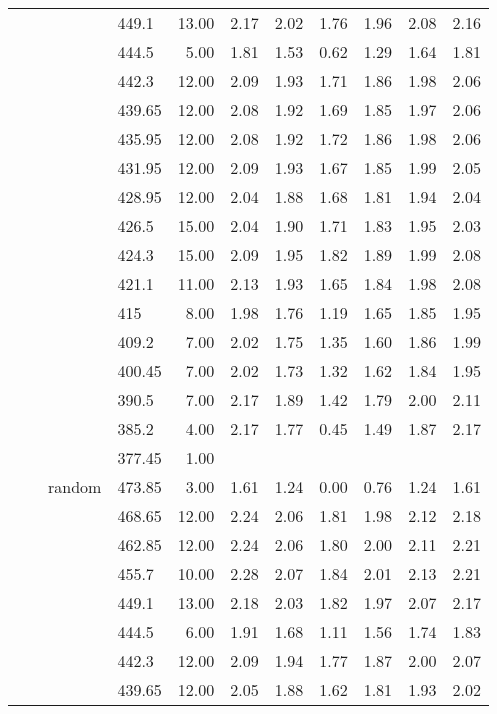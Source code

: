 \begin{longtable}{llllrrrrrrr}
   &  &  & 449.1 & 13.00 & 2.17 & 2.02 & 1.76 & 1.96 & 2.08 & 2.16 \\ 
   &  &  & 444.5 & 5.00 & 1.81 & 1.53 & 0.62 & 1.29 & 1.64 & 1.81 \\ 
   &  &  & 442.3 & 12.00 & 2.09 & 1.93 & 1.71 & 1.86 & 1.98 & 2.06 \\ 
   &  &  & 439.65 & 12.00 & 2.08 & 1.92 & 1.69 & 1.85 & 1.97 & 2.06 \\ 
   &  &  & 435.95 & 12.00 & 2.08 & 1.92 & 1.72 & 1.86 & 1.98 & 2.06 \\ 
   &  &  & 431.95 & 12.00 & 2.09 & 1.93 & 1.67 & 1.85 & 1.99 & 2.05 \\ 
   &  &  & 428.95 & 12.00 & 2.04 & 1.88 & 1.68 & 1.81 & 1.94 & 2.04 \\ 
   &  &  & 426.5 & 15.00 & 2.04 & 1.90 & 1.71 & 1.83 & 1.95 & 2.03 \\ 
   &  &  & 424.3 & 15.00 & 2.09 & 1.95 & 1.82 & 1.89 & 1.99 & 2.08 \\ 
   &  &  & 421.1 & 11.00 & 2.13 & 1.93 & 1.65 & 1.84 & 1.98 & 2.08 \\ 
   &  &  & 415 & 8.00 & 1.98 & 1.76 & 1.19 & 1.65 & 1.85 & 1.95 \\ 
   &  &  & 409.2 & 7.00 & 2.02 & 1.75 & 1.35 & 1.60 & 1.86 & 1.99 \\ 
   &  &  & 400.45 & 7.00 & 2.02 & 1.73 & 1.32 & 1.62 & 1.84 & 1.95 \\ 
   &  &  & 390.5 & 7.00 & 2.17 & 1.89 & 1.42 & 1.79 & 2.00 & 2.11 \\ 
   &  &  & 385.2 & 4.00 & 2.17 & 1.77 & 0.45 & 1.49 & 1.87 & 2.17 \\ 
   &  &  & 377.45 & 1.00 &  &  &  &  &  &  \\ 
   &  & random & 473.85 & 3.00 & 1.61 & 1.24 & 0.00 & 0.76 & 1.24 & 1.61 \\ 
   &  &  & 468.65 & 12.00 & 2.24 & 2.06 & 1.81 & 1.98 & 2.12 & 2.18 \\ 
   &  &  & 462.85 & 12.00 & 2.24 & 2.06 & 1.80 & 2.00 & 2.11 & 2.21 \\ 
   &  &  & 455.7 & 10.00 & 2.28 & 2.07 & 1.84 & 2.01 & 2.13 & 2.21 \\ 
   &  &  & 449.1 & 13.00 & 2.18 & 2.03 & 1.82 & 1.97 & 2.07 & 2.17 \\ 
   &  &  & 444.5 & 6.00 & 1.91 & 1.68 & 1.11 & 1.56 & 1.74 & 1.83 \\ 
   &  &  & 442.3 & 12.00 & 2.09 & 1.94 & 1.77 & 1.87 & 2.00 & 2.07 \\ 
   &  &  & 439.65 & 12.00 & 2.05 & 1.88 & 1.62 & 1.81 & 1.93 & 2.02 \\ 

\end{longtable}
